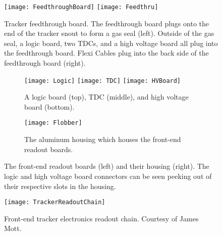 


\begin{figure}
    \centering
        \texttt{[image: FeedthroughBoard]}
    \hspace{1mm}
        \texttt{[image: Feedthru]}
    \caption[Tracker feedthough board]{Tracker feedthrough board. The feedthrough board plugs onto the end of the tracker snout to form a gas seal (left). Outside of the gas seal, a logic board, two TDCs, and a high voltage board all plug into the feedthrough board. Flexi Cables plug into the back side of the feedthrough board (right).}
    \label{fig:Feedthrough}
\end{figure}

\begin{figure}
    \centering
        \begin{subfigure}[b]{0.45\textwidth}
            \centering
            \texttt{[image: Logic]}
            \texttt{[image: TDC]}
            \texttt{[image: HVBoard]}
            \caption{A logic board (top), TDC (middle), and high voltage board (bottom).}
        \end{subfigure}
    \hspace{5mm}%
        \begin{subfigure}[b]{0.45\textwidth}
            \centering
            \texttt{[image: Flobber]}
            \caption{The aluminum housing which houses the front-end readout boards.}
        \end{subfigure}
    \caption[Tracker readout boards and housing]{The front-end readout boards (left) and their housing (right). The logic and high voltage board connectors can be seen peeking out of their respective slots in the housing.}
\label{fig:FrontEndElectronics}
\end{figure}



\begin{figure}
    \centering
    \texttt{[image: TrackerReadoutChain]}
    \caption[Front-end tracker electronics readout chain]{Front-end tracker electronics readout chain. Courtesy of James Mott.}   
    \label{fig:TrackerReadoutChain}
\end{figure}



